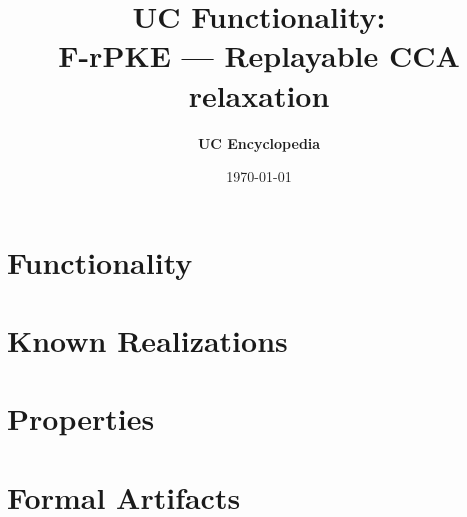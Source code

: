 \documentclass[11pt,a4paper]{article}
\title{\textbf{\Large UC Functionality:}\\[0.2em] \Large F-rPKE --- Replayable CCA relaxation}
\author{\textbf{UC Encyclopedia}}
\date{\today}
\newtheorem{functionality}{Functionality}
\begin{document}
\maketitle

\begin{abstract}
\end{abstract}

\section{Functionality}

%

\section{Known Realizations}


\section{Properties}


\section{Formal Artifacts}

\end{document}
